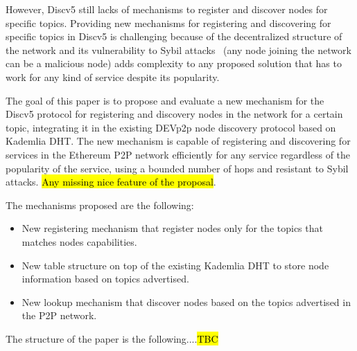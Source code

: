 However,  Discv5 still lacks of mechanisms to register and discover nodes for specific topics.
Providing new mechanisms for registering and discovering for specific topics in Discv5 is challenging because of the decentralized structure of the network and its vulnerability to Sybil attacks~\cite{} (any node joining the network can be a malicious node) adds complexity to any proposed solution that has to work for any kind of service despite its popularity.




The goal of this paper is to propose and evaluate a new mechanism for the Discv5 protocol for registering and discovery nodes in the network for a certain topic,  integrating it in the existing DEVp2p node discovery protocol based on Kademlia DHT.  
The new mechanism is capable of registering and discovering for services in the Ethereum P2P network efficiently for any service regardless of the popularity of the service, using a bounded number of hops and resistant to Sybil attacks.
\hl{Any missing nice feature of the proposal}.

The mechanisms proposed are the following:

\begin{itemize}
 \item New registering mechanism that register nodes only for the topics that matches nodes capabilities.
 \item New table structure on top of the existing Kademlia DHT to store node information based on topics advertised.
 \item New lookup mechanism that discover nodes based on the topics advertised in the P2P network.
\end{itemize}
    
The structure of the paper is the following....\hl{TBC}
